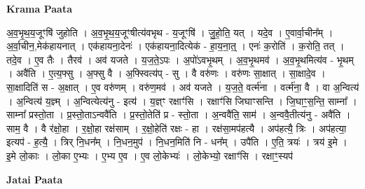 \documentclass[17pt]{extarticle}
\begin{document}
\textbf{Krama Paata} \newline

अ॒व॒भृ॒थ॒य॒जूꣳषि॑ जुहोति । अ॒व॒भृ॒थ॒य॒जूꣳषीत्य॑वभृथ - य॒जूꣳषि॑ । जु॒हो॒ति॒ यत् । यदे॒व । ए॒वार्वा॒चीन᳚म् । अ॒र्वा॒चीन॒,मेक॑हायनात् । एक॑हायना॒देनः॑ । एक॑हायना॒दित्येक॑ - हा॒य॒ना॒त्॒ । एनः॑ क॒रोति॑ । क॒रोति॒ तत् । तदे॒व । ए॒व तैः । तैरव॑ । अव॑ यजते । य॒ज॒ते॒ऽपः । अ॒पो॑ऽवभृ॒थम् । अ॒व॒भृ॒थमव॑ । अ॒व॒भृ॒थमित्य॑व - भृ॒थम् । अवै॑ति । ए॒त्य॒फ्सु । अ॒फ्सु वै । अ॒फ्स्वित्य॑प् - सु । वै वरु॑णः । वरु॑णः सा॒क्षात् । सा॒क्षादे॒व । सा॒क्षादिति॑ स - अ॒क्षात् । ए॒व वरु॑णम् । वरु॑ण॒मव॑ । अव॑ यजते । य॒ज॒ते॒ वर्त्म॑ना । वर्त्म॑ना॒ वै । वा अ॒न्वित्य॑ । अ॒न्वित्य॑ य॒ज्ञ्म् । अ॒न्वित्येत्य॑नु - इत्य॑ । य॒ज्ञ्ꣳ रक्षाꣳ॑सि । रक्षाꣳ॑सि जिघाꣳसन्ति । जि॒घाꣳ॒॒स॒न्ति॒ साम्ना᳚ । साम्ना᳚ प्रस्तो॒ता । प्र॒स्तो॒ताऽन्ववै॑ति । प्र॒स्तो॒तेति॑ प्र - स्तो॒ता । अ॒न्ववै॑ति॒ साम॑ । अ॒न्ववै॒तीत्य॑नु - अवै॑ति । साम॒ वै । वै र॑क्षो॒हा । र॒क्षो॒हा रक्ष॑साम् । र॒क्षो॒हेति॑ रक्षः - हा । रक्ष॑सा॒मप॑हत्यै । अप॑हत्यै॒ त्रिः । अप॑हत्या॒ इत्यप॑ - ह॒त्यै॒ । त्रिर् नि॒धन᳚म् । नि॒धन॒मुप॑ । नि॒धन॒मिति॑ नि - धन᳚म् । उपै॑ति । ए॒ति॒ त्रयः॑ । त्रय॑ इ॒मे । इ॒मे लो॒काः । लो॒का ए॒भ्यः । ए॒भ्य ए॒व । ए॒व लो॒केभ्यः॑ । लो॒केभ्यो॒ रक्षाꣳ॑सि । रक्षाꣳ॒॒स्यप॑ \newline

\textbf{Jatai Paata} \newline
\end{document}
